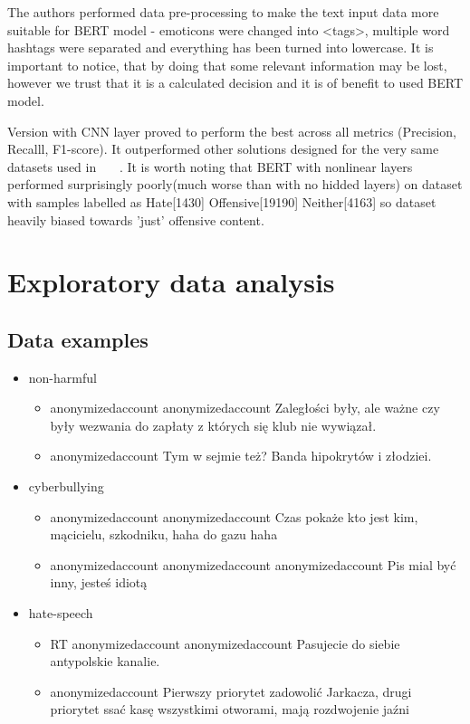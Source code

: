 \documentclass[a4paper]{article}
\begin{document}
\par
The authors performed data pre-processing to make the text input data more suitable for BERT model - emoticons were changed into <tags>, multiple word hashtags were separated and everything has been turned into lowercase. It is important to notice, that by doing that some relevant information may be lost, however we trust that it is a calculated decision and it is of benefit to used BERT model.
\par
Version with CNN layer proved to perform the best across all metrics (Precision, Recalll, F1-score). It outperformed other solutions designed for the very same datasets used in  ~\cite{ref1}~\cite{ref2}~\cite{ref3}. It is worth noting that BERT with nonlinear layers performed surprisingly poorly(much worse than with no hidded layers) on dataset with samples labelled as Hate[1430] Offensive[19190] Neither[4163] so dataset heavily biased towards 'just' offensive content.

\newpage
\section{Exploratory data analysis}
\subsection{Data examples}
\begin{itemize}
    \item non-harmful
        \begin{itemize}
            \item anonymizedaccount anonymizedaccount Zaległości były, ale ważne czy były wezwania do zapłaty z których się klub nie wywiązał.
            \item anonymizedaccount Tym w sejmie też? Banda hipokrytów i złodziei.
        \end{itemize}
    \item cyberbullying
        \begin{itemize}
            \item anonymizedaccount anonymizedaccount Czas pokaże kto jest kim, mącicielu, szkodniku, haha do gazu haha
            \item anonymizedaccount anonymizedaccount anonymizedaccount Pis mial być inny, jesteś idiotą
        \end{itemize}
    \item hate-speech
        \begin{itemize}
            \item RT anonymizedaccount anonymizedaccount Pasujecie do siebie antypolskie kanalie.
            \item anonymizedaccount Pierwszy priorytet zadowolić Jarkacza, drugi priorytet ssać kasę wszystkimi otworami,  mają rozdwojenie jaźni
        \end{itemize}
\end{itemize}
\end{document}
